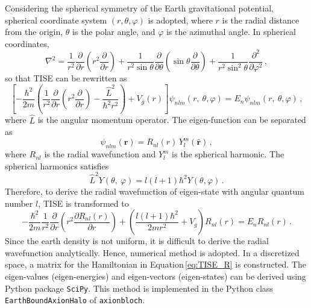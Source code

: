 Considering the spherical symmetry of the Earth gravitational potential, spherical coordinate system $(r, \theta, \varphi)$ is adopted, where $r$ is the radial distance from the origin, $\theta$ is the polar angle, and $\varphi$ is the azimuthal angle. 
In spherical coordinates, 
\begin{equation}
    \nabla^2 = \frac{1}{{r}^2}\frac{\partial}{\partial r}\left(r^2\frac{\partial}{\partial r}\right)+\frac{1}{r^2\sin\theta}\frac{\partial}{\partial \theta}\left(\sin\theta\frac{\partial}{\partial \theta}\right)+\frac{1}{r^2\sin^2\theta}\frac{\partial^2}{\partial \varphi^2}
    \,,\label{eq:laplacian_spherical}
\end{equation}
so that TISE can be rewritten as
\begin{equation}
    \left[-\frac{\hbar^2}{2m}\left(\frac{1}{{r}^2}\frac{\partial}{\partial r}\left(r^2\frac{\partial}{\partial r}\right)-\frac{{\hat{L}}^2}{\hbar^2r^2}\right)+V_g(r)\right]\psi_{nlm}\left(r,\ \theta,\varphi\right)=E_{n}\psi_{nlm}\left(r,\ \theta,\varphi\right)\,,
\end{equation}
where $\hat{L}$ is the angular momentum operator. 
The eigen-function can be separated as
\begin{equation}
    \psi_{nlm}(\mathbf{r}) = R_{nl}(r)\,Y_l^m(\hat{\mathbf{r}})
    \,,\label{eq:psi_R_Y}
\end{equation}
where $R_{nl}$ is the radial wavefunction and $Y_l^m$ is the spherical harmonic. 
The spherical harmonics satisfies
\begin{equation}
    {\hat{L}}^2Y\left(\theta,\ \varphi\right)=l\left(l+1\right)\hbar^2Y\left(\theta,\varphi\right)\,.
\end{equation}
Therefore, to derive the radial wavefunction of eigen-state with angular quantum number $l$, TISE is transformed to
\begin{equation}
    -\frac{\hbar^2}{2m}\frac{1}{{r}^2}\frac{\partial}{\partial r}\left(r^2\frac{\partial R_{nl}\left(r\right)}{\partial r}\right)+\left(\frac{l\left(l+1\right)\hbar^2}{2mr^2}+V_g\right)R_{nl}\left(r\right)=E_{n}R_{nl}\left(r\right)\,.
    \label{eq:TISE_R}
\end{equation}
Since the earth density is not uniform, it is difficult to derive the radial wavefunction analytically. 
Hence, numerical method is adopted. 
In a discretized space, a matrix for the Hamiltonian in Equation\,\eqref{eq:TISE_R} is constructed. 
The eigen-values (eigen-energies) and eigen-vectors (eigen-states) can be derived using Python package \texttt{SciPy}. 
This method is implemented in the Python class \texttt{EarthBoundAxionHalo} of \texttt{axionbloch}. 

